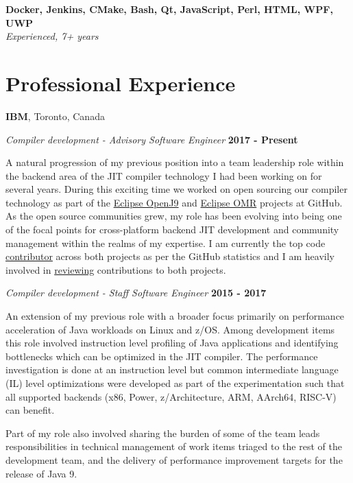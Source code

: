 \documentclass[margin,line]{res}
\begin{document}
\begin{resume}
{\bf Docker, Jenkins, CMake, Bash, Qt, JavaScript, Perl, HTML, WPF, UWP } \\
{\em Experienced, 7+ years}

\section{\sc Professional Experience}
{\bf IBM}, Toronto, Canada

{\em Compiler development - Advisory Software Engineer} \hfill {\bf 2017 - Present}
\vspace{-.12in}

A natural progression of my previous position into a team leadership role within the backend area of the JIT compiler 
technology I had been working on for several years. During this exciting time we worked on open sourcing our compiler
technology as part of the \href{https://github.com/eclipse/openj9}{Eclipse OpenJ9} and 
\href{https://github.com/eclipse/omr}{Eclipse OMR} projects at GitHub. As the open source communities grew, my role has
been evolving into being one of the focal points for cross-platform backend JIT development and community management
within the realms of my expertise. I am currently the top code \href{https://github.com/eclipse/omr/graphs/contributors}
{contributor} across both projects as per the GitHub statistics and I am heavily involved in 
\href{https://github.com/eclipse/omr/pulls?q=is%3Apr+sort%3Aupdated-desc+reviewed-by%3Afjeremic+is%3Aclosed+}{reviewing} 
contributions to both projects.

{\em Compiler development - Staff Software Engineer} \hfill {\bf 2015 - 2017}
\vspace{-.12in}

An extension of my previous role with a broader focus primarily on performance acceleration of Java workloads on Linux
and z/OS. Among development items this role involved instruction level profiling of Java applications and identifying
bottlenecks which can be optimized in the JIT compiler. The performance investigation is done at an instruction level
but common intermediate language (IL) level optimizations were developed as part of the experimentation such that all
supported backends (x86, Power, z/Architecture, ARM, AArch64, RISC-V) can benefit.

\newpage

Part of my role also involved sharing the burden of some of the team leads responsibilities in technical management of
work items triaged to the rest of the development team, and the delivery of performance improvement targets for the
release of Java 9.


\end{resume}
\end{document}
